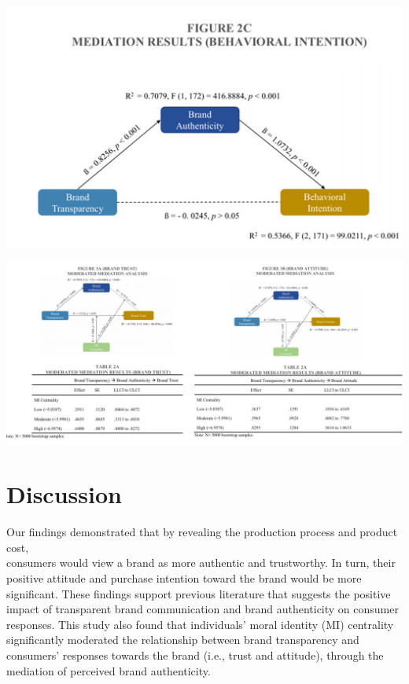 \documentclass[a0,portrait]{a0poster}
\begin{document}
\begin{minipage}[c]{\linewidth}
\begin{framed}
\begin{multicols}{2}
\begin{center}
\includegraphics[width=0.5\linewidth]{figures/AEJMC-Brand_Auth-Results-Figure 2C}
\label{ALICerros}
\end{center}

\begin{center}
\includegraphics[width=0.7\linewidth]{AEJMC-Brand_Auth-Results-3A_3B}
\label{ALICerros}
\end{center}
\color{Maroon}
\section*{Discussion}
\color{Black}
Our findings demonstrated that by revealing the production process and product cost, \\consumers would view a brand as more authentic and trustworthy. In turn, their \\positive attitude and purchase intention toward the brand would be more significant. These findings support previous literature that suggests the positive impact of transparent brand communication and brand authenticity on consumer responses. This study also found that individuals’ moral identity (MI) centrality significantly
moderated the relationship between brand transparency and consumers’ responses towards the brand (i.e., trust and attitude), through the mediation of perceived brand authenticity.


\color{Maroon} \\
\color{Black}
\printbibliography
\end{multicols}
\vspace{0.5cm}
\end{framed}
\end{minipage}
\end{document}
